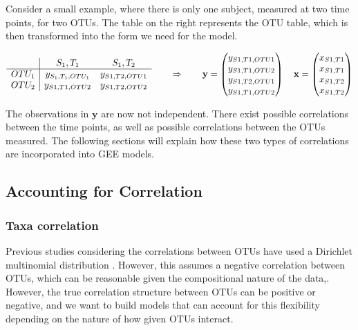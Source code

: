 \documentclass[12pt]{article}
\begin{document}
Consider a small example, where there is only one subject, measured at two time points, for two OTUs. The table on the right represents the OTU table, which is then transformed into the form we need for the model.
\begin{singlespace}
$$
\begin{array}{c| c c}
  & S_1,T_1 & S_1,T_2\\
  \hline
  OTU_1 & y_{S_1,T_1,OTU_1} & y_{S1,T2,OTU1}\\
  OTU_2 & y_{S1,T1,OTU2} & y_{S1,T2,OTU2}\\
\end{array}
\qquad \Rightarrow \qquad
\mathbf{y} = \begin{pmatrix}
    y_{S1,T1,OTU1}\\
    y_{S1,T1,OTU2}\\
    y_ {S1,T2,OTU1}\\
    y_{S1,T1,OTU2}
\end{pmatrix} \quad
\mathbf{x} = \begin{pmatrix}
      x_{S1,T1}\\
      x_{S1,T1}\\
      x_{S1,T2}\\
      x_{S1,T2}
\end{pmatrix}
$$
\end{singlespace}
The observations in $\mathbf{y}$ are now not independent. There exist possible correlations between the time points, as well as possible correlations between the OTUs measured. The following sections will explain how these two types of correlations are incorporated into GEE models.

\subsection{Accounting for Correlation}
\subsubsection{Taxa correlation}

Previous studies considering the correlations between OTUs have used a Dirichlet multinomial distribution \cite{la2012hypothesis}. However, this assumes a negative correlation between OTUs, which can be reasonable given the compositional nature of the data,. However, the true correlation structure between OTUs can be positive or negative\cite{mandal2015analysis}, and we want to build models that can account for this flexibility depending on the nature of how given OTUs interact.
\end{document}
